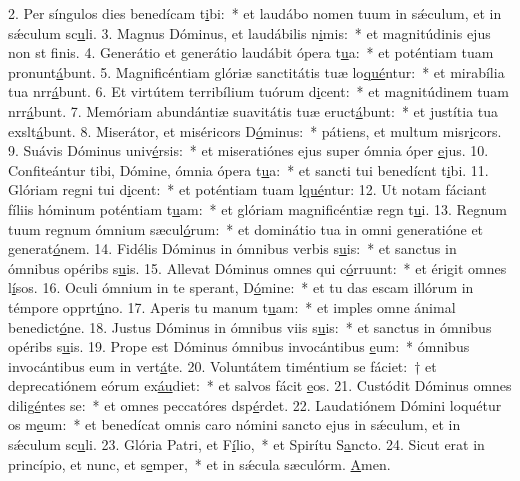 2. Per síngulos dies benedícam t\uline{i}bi:~* et laudábo nomen tuum in sǽculum, et in sǽculum sc\uline{u}li.
3. Magnus Dóminus, et laudábilis n\uline{i}mis:~* et magnitúdinis ejus non st f\uline{i}nis.
4. Generátio et generátio laudábit ópera t\uline{u}a:~* et poténtiam tuam pronunt\uline{á}bunt.
5. Magnificéntiam glóriæ sanctitátis tuæ lo\uline{qué}ntur:~* et mirabília tua nrr\uline{á}bunt.
6. Et virtútem terribílium tuórum d\uline{i}cent:~* et magnitúdinem tuam nrr\uline{á}bunt.
7. Memóriam abundántiæ suavitátis tuæ eruct\uline{á}bunt:~* et justítia tua exslt\uline{á}bunt.
8. Miserátor, et miséricors D\uline{ó}minus:~* pátiens, et multum misr\uline{i}cors.
9. Suávis Dóminus univ\uline{é}rsis:~* et miseratiónes ejus super ómnia óper \uline{e}jus.
10. Confiteántur tibi, Dómine, ómnia ópera t\uline{u}a:~* et sancti tui benedícnt t\uline{i}bi.
11. Glóriam regni tui d\uline{i}cent:~* et poténtiam tuam l\uline{qué}ntur:
12. Ut notam fáciant fíliis hóminum poténtiam t\uline{u}am:~* et glóriam magnificéntiæ regn t\uline{u}i.
13. Regnum tuum regnum ómnium sæcul\uline{ó}rum:~* et dominátio tua in omni generatióne et generat\uline{ó}nem.
14. Fidélis Dóminus in ómnibus verbis s\uline{u}is:~* et sanctus in ómnibus opéribs s\uline{u}is.
15. Allevat Dóminus omnes qui c\uline{ó}rruunt:~* et érigit omnes l\uline{í}sos.
16. Oculi ómnium in te sperant, D\uline{ó}mine:~* et tu das escam illórum in témpore opprt\uline{ú}no.
17. Aperis tu manum t\uline{u}am:~* et imples omne ánimal benedict\uline{ó}ne.
18. Justus Dóminus in ómnibus viis s\uline{u}is:~* et sanctus in ómnibus opéribs s\uline{u}is.
19. Prope est Dóminus ómnibus invocántibus \uline{e}um:~* ómnibus invocántibus eum in vert\uline{á}te.
20. Voluntátem timéntium se fáciet:~† et deprecatiónem eórum ex\uline{áu}diet:~* et salvos fácit \uline{e}os.
21. Custódit Dóminus omnes dilig\uline{é}ntes se:~* et omnes peccatóres dsp\uline{é}rdet.
22. Laudatiónem Dómini loquétur os m\uline{e}um:~* et benedícat omnis caro nómini sancto ejus in sǽculum, et in sǽculum sc\uline{u}li.
23. Glória Patri, et F\uline{í}lio,~* et Spirítu S\uline{a}ncto.
24. Sicut erat in princípio, et nunc, et s\uline{e}mper,~* et in sǽcula sæculórm. \uline{A}men.
